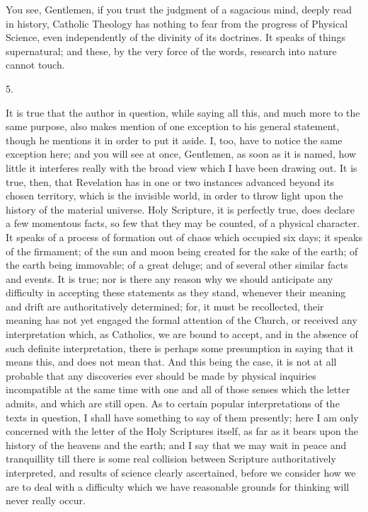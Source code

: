You see, Gentlemen, if you trust the judgment of a sagacious mind,
deeply read in history, Catholic Theology has nothing to fear from the
progress of Physical Science, even independently of the divinity of
its doctrines. It speaks of things supernatural; and these, by the
very force of the words, research into nature cannot touch.

5.

It is true that the author in question, while saying all this, and much more to the same purpose, also makes mention of one
exception to his general statement, though he mentions it in order to
put it aside. I, too, have to notice the same exception here; and you
will see at once, Gentlemen, as soon as it is named, how little it
interferes really with the broad view which I have been drawing out.
It is true, then, that Revelation has in one or two instances advanced
beyond its chosen territory, which is the invisible world, in order to
throw light upon the history of the material universe. Holy Scripture,
it is perfectly true, does declare a few momentous facts, so few that
they may be counted, of a physical character. It speaks of a process
of formation out of chaos which occupied six days; it speaks of the
firmament; of the sun and moon being created for the sake of the
earth; of the earth being immovable; of a great deluge; and of several
other similar facts and events. It is true; nor is there any reason
why we should anticipate any difficulty in accepting these statements
as they stand, whenever their meaning and drift are authoritatively
determined; for, it must be recollected, their meaning has not yet
engaged the formal attention of the Church, or received any
interpretation which, as Catholics, we are bound to accept, and in the
absence of such definite interpretation, there is perhaps some
presumption in saying that it means this, and does not mean that. And
this being the case, it is not at all probable that any discoveries
ever should be made by physical inquiries incompatible at the same
time with one and all of those senses which the letter admits, and
which are still open. As to certain popular interpretations of the
texts in question, I shall have something to say of them presently;
here I am only concerned with the letter of the Holy Scriptures
itself, as far as it bears upon the history of the heavens and
the earth; and I say that we may wait in peace and tranquillity till
there is some real collision between Scripture authoritatively
interpreted, and results of science clearly ascertained, before we
consider how we are to deal with a difficulty which we have reasonable
grounds for thinking will never really occur.

